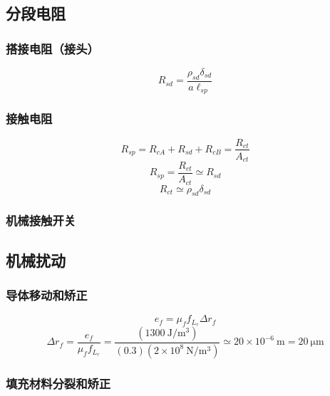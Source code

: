 \subsection{分段电阻}



\subsubsection*{搭接电阻（接头）}
\begin{equation}%
R_{sd}=\frac{\rho_{sd}\delta_{sd}}{a\ell_{sp}}
\end{equation}


\subsubsection*{接触电阻}
\begin{equation}%
R_{sp}=R_{cA}+R_{sd}+R_{cB} 
=\frac{R_{ct}}{A_{ct}}
\end{equation}
\begin{equation}%
R_{sp}=\frac{R_{ct}}{A_{ct}}\simeq R_{sd}
\end{equation}
\begin{equation}%
R_{ct}\simeq\rho_{sd}\delta_{sd}
\end{equation}


\subsubsection*{机械接触开关}

\subsection{机械扰动}

\subsubsection*{导体移动和矫正}
\begin{equation}%
e_f=\mu_ff_{L_r}\Delta r_f
\end{equation}
\begin{equation}%
\Delta r_f=\frac{e_f}{\mu_ff_{L_r}}=\frac{(1300\ \mathrm{J/m^3})}{(0.3)(2\times 10^8\ \mathrm{N/m^3})}\simeq 20\times 10^{-6}\ \mathrm{m}=20\ \mathrm{\mu m}
\end{equation}


\subsubsection*{填充材料分裂和矫正}

